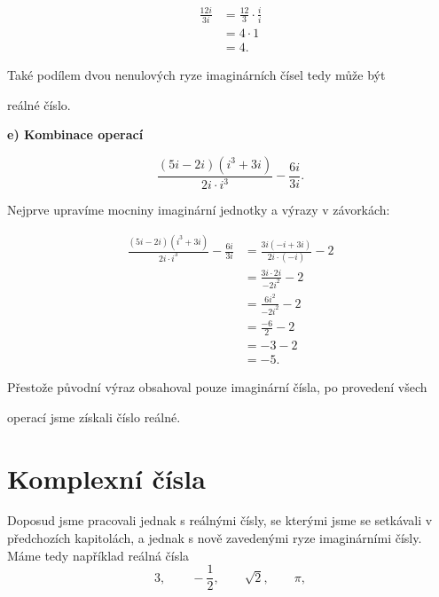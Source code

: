 \documentclass[12pt,a4paper]{article}
\begin{document}
\begin{examplebox}
    \begin{align*}
        \frac{12i}{3i}
        &= \frac{12}{3}\cdot\frac{i}{i} \\
        &= 4\cdot1 \\
        &= 4.
    \end{align*}

    Také podílem dvou nenulových ryze imaginárních čísel tedy může být

    reálné číslo.

    \textbf{e) Kombinace operací}

    \[
        \frac{(5i-2i)(i^3+3i)}{2i\cdot i^3}
        -
        \frac{6i}{3i}.
    \]

    Nejprve upravíme mocniny imaginární jednotky a výrazy v závorkách:

    \begin{align*}
        \frac{(5i-2i)(i^3+3i)}{2i\cdot i^3}
        -
        \frac{6i}{3i}
        &=
        \frac{3i(-i+3i)}{2i\cdot(-i)}
        -
        2
        \\[2mm]
        &=
        \frac{3i\cdot2i}{-2i^2}
        -
        2
        \\[2mm]
        &=
        \frac{6i^2}{-2i^2}
        -
        2
        \\[2mm]
        &=
        \frac{-6}{2}
        -
        2
        \\[2mm]
        &=
        -3-2
        \\[2mm]
        &=
        -5.
    \end{align*}

    Přestože původní výraz obsahoval pouze imaginární čísla, po provedení všech

    operací jsme získali číslo reálné.

\end{examplebox}






\section{Komplexní čísla}
Doposud jsme pracovali jednak s reálnými čísly, 
se kterými jsme se setkávali v předchozích kapitolách, 
a jednak s nově zavedenými ryze imaginárními čísly.
Máme tedy například reálná čísla
\[
    3,\qquad -\frac{1}{2},\qquad \sqrt{2},\qquad \pi,
\]
\end{document}

